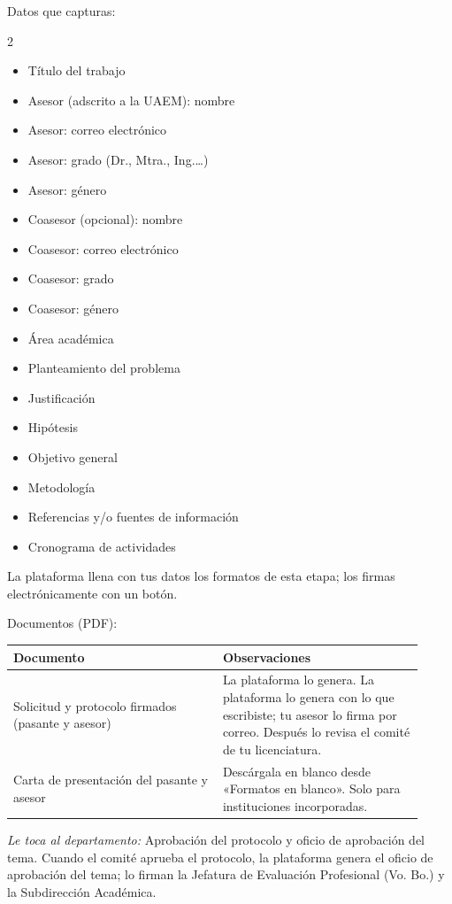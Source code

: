 Datos que capturas:
\begin{multicols}{2}\small
\begin{itemize}
  \item Título del trabajo
  \item Asesor (adscrito a la UAEM): nombre
  \item Asesor: correo electrónico
  \item Asesor: grado (Dr., Mtra., Ing.…)
  \item Asesor: género
  \item Coasesor (opcional): nombre
  \item Coasesor: correo electrónico
  \item Coasesor: grado
  \item Coasesor: género
  \item Área académica
  \item Planteamiento del problema
  \item Justificación
  \item Hipótesis
  \item Objetivo general
  \item Metodología
  \item Referencias y/o fuentes de información
  \item Cronograma de actividades
\end{itemize}
\end{multicols}

La plataforma llena con tus datos los formatos de esta etapa; los firmas electrónicamente con un botón.

Documentos (PDF):
{\small\begin{longtable}{>{\raggedright\arraybackslash}p{0.47\linewidth}>{\raggedright\arraybackslash}p{0.45\linewidth}}
\toprule
\textbf{Documento} & \textbf{Observaciones}\\
\midrule
\endhead
Solicitud y protocolo firmados (pasante y asesor) & La plataforma lo genera. La plataforma lo genera con lo que escribiste; tu asesor lo firma por correo. Después lo revisa el comité de tu licenciatura.\\
Carta de presentación del pasante y asesor & Descárgala en blanco desde «Formatos en blanco». Solo para instituciones incorporadas.\\
\bottomrule
\end{longtable}}

\emph{Le toca al departamento:} Aprobación del protocolo y oficio de aprobación del tema. Cuando el comité aprueba el protocolo, la plataforma genera el oficio de aprobación del tema; lo firman la Jefatura de Evaluación Profesional (Vo. Bo.) y la Subdirección Académica.
